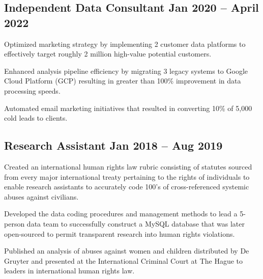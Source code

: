 \documentclass[singlesided, paper=a4, fontsize=10.5pt]{testing-class}
\begin{document}
{    \subsection{Independent Data Consultant \hfill Jan 2020 -- April 2022}
    \begin{zitemize}
        \item Optimized marketing strategy by implementing 2 customer data platforms to effectively target roughly 2 million high-value potential customers.
        \item Enhanced analysis pipeline efficiency by migrating 3 legacy systems to Google Cloud Platform (GCP) resulting in greater than 100\% improvement in data processing speeds.
        \item Automated email marketing initiatives that resulted in converting 10\% of 5,000 cold leads to clients.
    \end{zitemize}

    \subsection{Research Assistant \hfill Jan 2018 -- Aug 2019}
    \begin{zitemize}
        \item Created an international human rights law rubric consisting of statutes sourced from every major international treaty pertaining to the rights of individuals to enable research assistants to accurately code 100's of cross-referenced systemic abuses against civilians.
        \item Developed the data coding procedures and management methods to lead a 5-person data team to successfully construct a MySQL database that was later open-sourced to permit transparent research into human rights violations.
        \item Published an analysis of abuses against women and children distributed by De Gruyter and presented at the International Criminal Court at The Hague to leaders in international human rights law.
    \end{zitemize}
    




}
\end{document}
